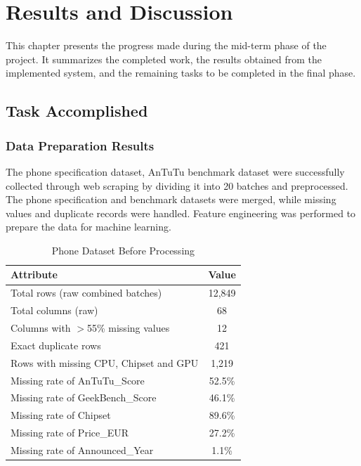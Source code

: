 \documentclass[12pt, a4paper]{report}
\numberwithin{figure}{chapter}
\numberwithin{table}{chapter}
\numberwithin{equation}{chapter}
\begin{document}

\chapter{Results and Discussion}

This chapter presents the progress made during the mid-term phase of the project. It summarizes the completed work, the results obtained from the implemented system, and the remaining tasks to be completed in the final phase.

\section{Task Accomplished}

\subsection{Data Preparation Results}

The phone specification dataset, AnTuTu benchmark dataset were successfully collected through web scraping by dividing it into 20 batches and preprocessed. The phone specification and benchmark datasets were merged, while missing values and duplicate records were handled. Feature engineering was performed to prepare the data for machine learning.


\begin{table}[H]
\centering
\caption{Phone Dataset Before Processing}
\label{tab:before-processing}
\begin{tabular}{|l|c|}
\hline
\textbf{Attribute} & \textbf{Value} \\
\hline
Total rows (raw combined batches) & 12,849 \\
\hline
Total columns (raw) & 68 \\
\hline
Columns with $>$55\% missing values & 12 \\
\hline
Exact duplicate rows & 421 \\
\hline
Rows with missing CPU, Chipset and GPU & 1,219 \\
\hline
Missing rate of AnTuTu\_Score & 52.5\% \\
\hline
Missing rate of GeekBench\_Score & 46.1\% \\
\hline
Missing rate of Chipset & 89.6\% \\
\hline
Missing rate of Price\_EUR & 27.2\% \\
\hline
Missing rate of Announced\_Year & 1.1\% \\
\hline
\end{tabular}
\end{table}
\end{document}
